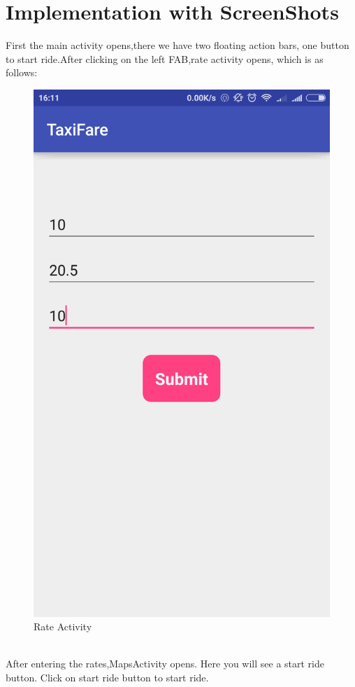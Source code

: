 \section{Implementation with ScreenShots}
	First the main activity opens,there we have two floating action bars, one button to start ride.After clicking on the left FAB,rate activity opens, which is as follows:
\begin{figure}[h]
	\centering
	\includegraphics[width=0.7\linewidth]{p05}
	\caption{Rate Activity}
\end{figure}
\\
After entering the rates,MapsActivity opens. Here you will see a start ride button. Click on start ride button to start ride.

